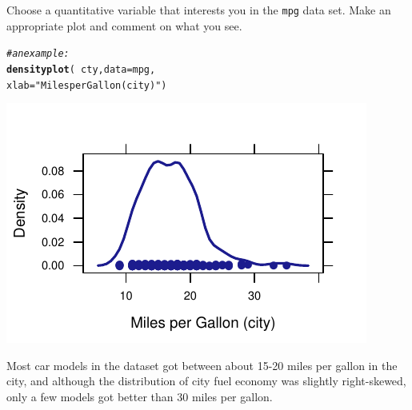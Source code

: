 \documentclass[twoside]{book}\usepackage[]{graphicx}\usepackage[]{xcolor}
\makeatletter
\def\maxwidth{ %
  \ifdim\Gin@nat@width>\linewidth
    \linewidth
  \else
    \Gin@nat@width
  \fi
}
\newcommand{\hlstr}[1]{\textcolor[rgb]{0.192,0.494,0.8}{#1}}%
\newcommand{\hlcom}[1]{\textcolor[rgb]{0.678,0.584,0.686}{\textit{#1}}}%
\newcommand{\hlopt}[1]{\textcolor[rgb]{0,0,0}{#1}}%
\newcommand{\hlstd}[1]{\textcolor[rgb]{0.345,0.345,0.345}{#1}}%
\newcommand{\hlkwc}[1]{\textcolor[rgb]{0.333,0.667,0.333}{#1}}%
\newcommand{\hlkwd}[1]{\textcolor[rgb]{0.737,0.353,0.396}{\textbf{#1}}}%
\newenvironment{kframe}{%
 \def\at@end@of@kframe{}%
 \ifinner\ifhmode%
  \def\at@end@of@kframe{\end{minipage}}%
  \begin{minipage}{\columnwidth}%
 \fi\fi%
 \def\FrameCommand##1{\hskip\@totalleftmargin \hskip-\fboxsep
 \colorbox{shadecolor}{##1}\hskip-\fboxsep
     \hskip-\linewidth \hskip-\@totalleftmargin \hskip\columnwidth}%
 \MakeFramed {\advance\hsize-\width
   \@totalleftmargin\z@ \linewidth\hsize
   \@setminipage}}%
 {\par\unskip\endMakeFramed%
 \at@end@of@kframe}
\newenvironment{knitrout}{}{} %
\newcommand{\Rindex}[1]{\index{\texttt{#1}}}
\newcommand{\dataframe}[1]{{\color{blue!80!black}\texttt{#1}}\Rindex{#1}}
\newcounter{example}[section]
\makeatother
\begin{document}
\begin{problem}
	Choose a quantitative variable that interests you in the \dataframe{mpg}
	data set.  Make an appropriate plot and comment on what you see.
\end{problem}
\begin{solution}
\begin{knitrout}
\color{fgcolor}\begin{kframe}
\begin{alltt}
\hlcom{#an example:}
\hlkwd{densityplot}\hlstd{(}\hlopt{~} \hlstd{cty ,} \hlkwc{data}\hlstd{=mpg,}
        \hlkwc{xlab}\hlstd{=}\hlstr{"Miles per Gallon (city)"}\hlstd{)}
\end{alltt}
\end{kframe}

{\centering \includegraphics[width=\maxwidth]{figures/fig-unnamed-chunk-25-1} 

}



\end{knitrout}
Most car models in the dataset got between about 15-20 miles per gallon in the city, and although the distribution of city fuel economy was slightly right-skewed, only a few models got better than 30 miles per gallon. 
\end{solution}
\end{document}
